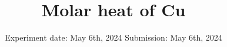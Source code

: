

\subject{V47}
\title{Molar heat of Cu}
\date{
  Experiment date: May 6th, 2024
  \hspace{3em}
  Submission: May 6th, 2024
}



\maketitle
\thispagestyle{empty}
\tableofcontents
\newpage
\setcounter{page}{1}



%



\newpage
\printbibliography
\nocite{ap47}
\nocite{matplotlib}
\nocite{numpy}
\nocite{scipy}
\nocite{uncertainties}
\nocite{reback2020pandas}

\newpage
%
%


